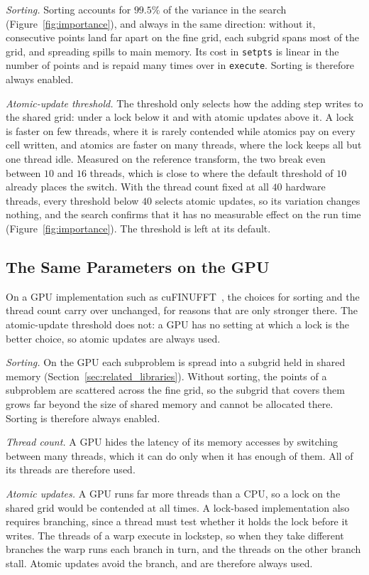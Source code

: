 \emph{Sorting.} Sorting accounts for $99.5\%$ of the variance in the search (Figure~\ref{fig:importance}), and always in the same direction: without it, consecutive points land far apart on the fine grid, each subgrid spans most of the grid, and spreading spills to main memory. Its cost in \texttt{setpts} is linear in the number of points and is repaid many times over in \texttt{execute}. Sorting is therefore always enabled.

\emph{Atomic-update threshold.} The threshold only selects how the adding step writes to the shared grid: under a lock below it and with atomic updates above it. A lock is faster on few threads, where it is rarely contended while atomics pay on every cell written, and atomics are faster on many threads, where the lock keeps all but one thread idle. Measured on the reference transform, the two break even between $10$ and $16$ threads, which is close to where the default threshold of $10$ already places the switch. With the thread count fixed at all $40$ hardware threads, every threshold below $40$ selects atomic updates, so its variation changes nothing, and the search confirms that it has no measurable effect on the run time (Figure~\ref{fig:importance}). The threshold is left at its default.

\subsection{The Same Parameters on the GPU}
\label{sec:eliminated_gpu}

On a GPU implementation such as cuFINUFFT~\cite{shih2021}, the choices for sorting and the thread count carry over unchanged, for reasons that are only stronger there. The atomic-update threshold does not: a GPU has no setting at which a lock is the better choice, so atomic updates are always used.

\emph{Sorting.} On the GPU each subproblem is spread into a subgrid held in shared memory (Section~\ref{sec:related_libraries}). Without sorting, the points of a subproblem are scattered across the fine grid, so the subgrid that covers them grows far beyond the size of shared memory and cannot be allocated there. Sorting is therefore always enabled.

\emph{Thread count.} A GPU hides the latency of its memory accesses by switching between many threads, which it can do only when it has enough of them. All of its threads are therefore used.

\emph{Atomic updates.} A GPU runs far more threads than a CPU, so a lock on the shared grid would be contended at all times. A lock-based implementation also requires branching, since a thread must test whether it holds the lock before it writes. The threads of a warp execute in lockstep, so when they take different branches the warp runs each branch in turn, and the threads on the other branch stall. Atomic updates avoid the branch, and are therefore always used.

